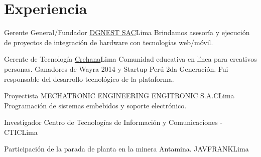 \section{Experiencia}

{Gerente General/Fundador}
{\href{http://dgnest.com}{DGNEST SAC}}{Lima}
{Brindamos asesoría y ejecución de proyectos de integración de hardware con tecnologías web/móvil.}
{} 

{Gerente de Tecnología}
{\href{http://www.crehana.com}{Crehana}}{Lima}
{Comunidad educativa en línea para creativos personas. Ganadores de Wayra 2014 y Startup Perú 2da Generación. Fui responsable del desarrollo tecnológico de la plataforma.}
{} 

{Proyectista}
{MECHATRONIC ENGINEERING ENGITRONIC S.A.C}{Lima}
{Programación de sistemas embebidos y soporte electrónico.}
{} 

{Investigador}
{Centro de Tecnologías de Información y Comunicaciones - CTIC}{Lima}
{}
{} 

{Participación de la parada de planta en la minera Antamina.}
{JAVFRANK}{Lima}
{}
{}  